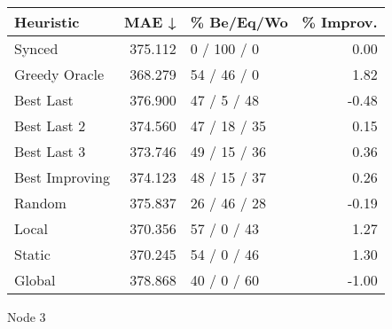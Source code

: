 \begin{tabular}{lrlr}
\toprule
\textbf{Heuristic} & \textbf{MAE ↓} & \textbf{\% Be/Eq/Wo} & \textbf{\% Improv.} \\
\midrule
            Synced &        375.112 &          0 / 100 / 0 &                0.00 \\
     Greedy Oracle &        368.279 &          54 / 46 / 0 &                1.82 \\
         Best Last &        376.900 &          47 / 5 / 48 &               -0.48 \\
       Best Last 2 &        374.560 &         47 / 18 / 35 &                0.15 \\
       Best Last 3 &        373.746 &         49 / 15 / 36 &                0.36 \\
    Best Improving &        374.123 &         48 / 15 / 37 &                0.26 \\
            Random &        375.837 &         26 / 46 / 28 &               -0.19 \\
             Local &        370.356 &          57 / 0 / 43 &                1.27 \\
            Static &        370.245 &          54 / 0 / 46 &                1.30 \\
            Global &        378.868 &          40 / 0 / 60 &               -1.00 \\
\bottomrule
\end{tabular}
\caption{Node 3}
\label{tab:non_lr05_le2_bs4_3}
